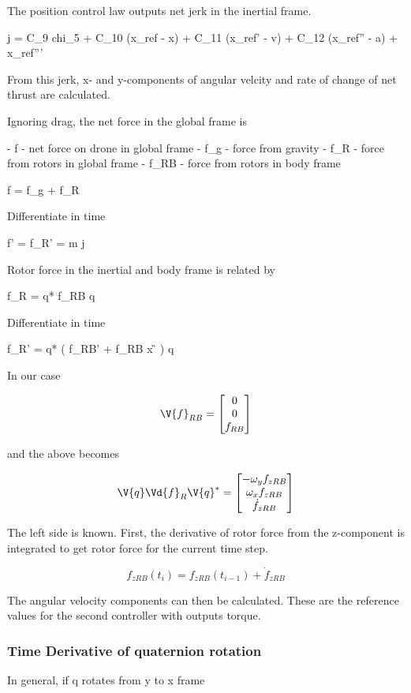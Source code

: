 The position control law outputs net jerk in the inertial frame.

j = C_9 chi_5 + C_10 (x_ref - x) + C_11 (x_ref' - v) + C_12 (x_ref'' - a) + x_ref'''

From this jerk, x- and y-components of angular velcity and rate of change of net thrust are calculated.

Ignoring drag, the net force in the global frame is

- f - net force on drone in global frame
- f_g - force from gravity
- f_R - force from rotors in global frame
- f_RB - force from rotors in body frame

f = f_g + f_R

Differentiate in time

f' = f_R' = m j

Rotor force in the inertial and body frame is related by

f_R = q* f_RB q

Differentiate in time

f_R' = q* ( f_RB' + f_RB x \G{\omega} ) q

In our case

\[
\V{f}_{RB} = \begin{bmatrix} 0 \\ 0 \\ f_{RB} \end{bmatrix}
\]

and the above becomes

\[
\V{q} \Vd{f}_R \V{q}^* =
\begin{bmatrix}
-\omega_y f_{zRB} \\
\omega_x f_{zRB} \\
\dot{f}_{zRB}
\end{bmatrix}
\]

The left side is known. First, the derivative of rotor force from the z-component is integrated to get rotor force for the current time step.

\[
f_{zRB}(t_i) = f_{zRB}(t_{i-1}) + \dot{f}_{zRB}
\]

The angular velocity components can then be calculated. These are the reference values for the second controller with outputs torque.

\subsubsection{Time Derivative of quaternion rotation}

In general, if q rotates from y to x frame


